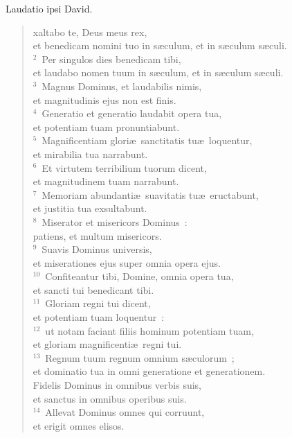 \bchapter[Psalm]
Laudatio ipsi David. \begin{verse}xaltabo te, Deus meus rex,\\ et benedicam nomini tuo in s\ae culum, et in s\ae culum s\ae culi.\\
${}^{2}$~Per singulos dies benedicam tibi,\\ et laudabo nomen tuum in s\ae culum, et in s\ae culum s\ae culi.\\
${}^{3}$~Magnus Dominus, et laudabilis nimis,\\ et magnitudinis ejus non est finis.\\
${}^{4}$~Generatio et generatio laudabit opera tua,\\ et potentiam tuam pronuntiabunt.\\
${}^{5}$~Magnificentiam glori\ae\ sanctitatis tu\ae\ loquentur,\\ et mirabilia tua narrabunt.\\
${}^{6}$~Et virtutem terribilium tuorum dicent,\\ et magnitudinem tuam narrabunt.\\
${}^{7}$~Memoriam abundanti\ae\ suavitatis tu\ae\ eructabunt,\\ et justitia tua exsultabunt.\\
${}^{8}$~Miserator et misericors Dominus~:\\ patiens, et multum misericors.\\
${}^{9}$~Suavis Dominus universis,\\ et miserationes ejus super omnia opera ejus.\\
${}^{10}$~Confiteantur tibi, Domine, omnia opera tua,\\ et sancti tui benedicant tibi.\\
${}^{11}$~Gloriam regni tui dicent,\\ et potentiam tuam loquentur~:\\
${}^{12}$~ut notam faciant filiis hominum potentiam tuam,\\ et gloriam magnificenti\ae\ regni tui.\\
${}^{13}$~Regnum tuum regnum omnium s\ae culorum~;\\ et dominatio tua in omni generatione et generationem.\\ Fidelis Dominus in omnibus verbis suis,\\ et sanctus in omnibus operibus suis.\\
${}^{14}$~Allevat Dominus omnes qui corruunt,\\ et erigit omnes elisos.\\

\end{verse}
